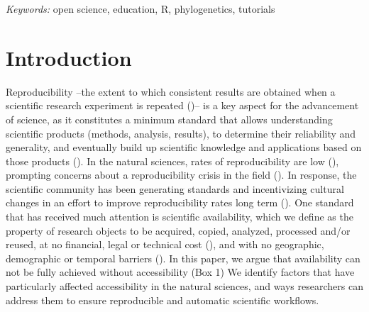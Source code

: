 \documentclass[12pt]{article}
\begin{document}
\noindent%
{\it Keywords:}  open science, education, R, phylogenetics, tutorials
\vfill

\newpage
{} %
\section{Introduction}
\label{sec:intro}

Reproducibility --the extent to which consistent results are obtained when a scientific
research experiment is repeated (\cite{repdef2021})-- is a key aspect for the advancement
of science, as it constitutes a minimum standard that allows understanding scientific products
(methods, analysis, results),
to determine their reliability and generality, and eventually build up scientific
knowledge and applications based on those products
(\cite{king1995replication, peng2011reproducible, powers2019open}).
In the natural sciences, rates of reproducibility are low (\cite{ioannidis2005most, prinz2011believe}),
prompting concerns about a reproducibility crisis in the field (\cite{baker2016reproducibility}).
In response, the scientific community has been generating standards and incentivizing
cultural changes in an effort to improve reproducibility rates long term
(\cite{peng2015reproducibility, wilkinson2016fair}).
One standard that has received much attention is scientific availability, which
 we define as the property of research objects to be acquired, copied, analyzed,
  processed and/or reused, at no financial, legal or technical cost (\cite{arnold2019turing}),
   and with no geographic, demographic or temporal barriers (\cite{fecher2014open}).
In this paper, we argue that availability can not be fully achieved without accessibility (Box 1)
We identify factors that have particularly affected accessibility in
the natural sciences, and ways researchers can address them to ensure reproducible
and automatic scientific workflows.


\bigskip
\bigskip
\end{document}

